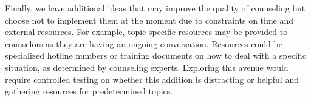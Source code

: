 Finally, we have additional ideas that may improve the quality of counseling but
choose not to implement them at the moment due to constraints on time and external
resources. For example, topic-specific resources may be provided to counselors as they
are having an ongoing conversation. Resources could be specialized hotline numbers
or training documents on how to deal with a specific situation, as determined by
counseling experts. Exploring this avenue would require controlled testing on whether
this addition is distracting or helpful and gathering resources for predetermined topics.
